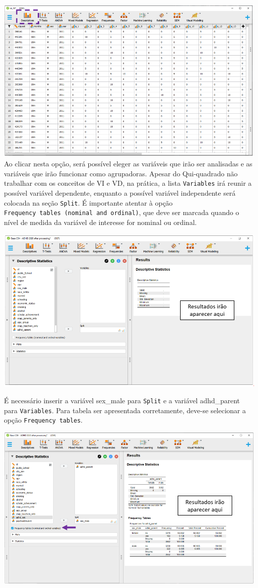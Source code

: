 \documentclass[
]{book}
\begin{document}
\includegraphics{./img/jasp_descriptives.png} Ao clicar nesta opção,
será possível eleger as variáveis que irão ser analisadas e as variáveis
que irão funcionar como agrupadoras. Apesar do Qui-quadrado não
trabalhar com os conceitos de VI e VD, na prática, a lista
\texttt{Variables} irá reunir a possível variável dependente, enquanto a
possível variável independente será colocada na seção \texttt{Split}. É
importante atentar à opção
\texttt{Frequency\ tables\ (nominal\ and\ ordinal)}, que deve ser
marcada quando o nível de medida da variável de interesse for nominal ou
ordinal.

\includegraphics{./img/cap_x2_primeira_tabela.png}

É necessário inserir a variável sex\_male para \texttt{Split} e a
variável adhd\_parent para \texttt{Variables}. Para tabela ser
apresentada corretamente, deve-se selecionar a opção
\texttt{Frequency\ tables}.

\includegraphics{./img/cap_x2_descritivo.png}
\end{document}
